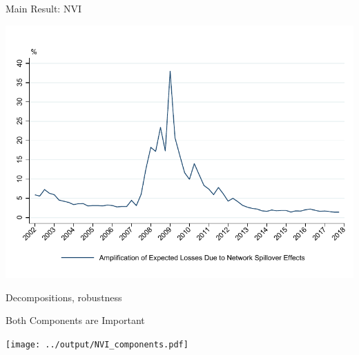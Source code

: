 \documentclass[12pt,envcountsect, leqno,xcolor=dvipsnames]{beamer}
\begin{document}
%
%


\begin{frame}{Main Result: NVI} 

\begin{center}
\includegraphics[width=\linewidth, height=0.9\textheight,keepaspectratio]{../output/NVI_benchmark.pdf}
\end{center}

\end{frame}

\begin{frame}

{\Large  Decompositions, robustness}

\end{frame}

\begin{frame}{Both Components are Important} 

\begin{center}
\texttt{[image: ../output/NVI\_components.pdf]}
\end{center}

\end{frame}
\end{document}
